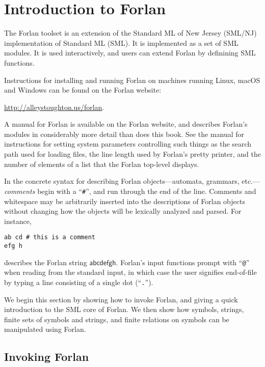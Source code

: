 \section{Introduction to Forlan}
\label{IntroductionToForlan}

The Forlan
%
toolset is an extension of the Standard ML of New Jersey (SML/NJ)
implementation of Standard ML (SML).  It is implemented as a set of
SML modules.  It is used interactively, and users can extend Forlan by
definining SML functions.

Instructions for installing and running Forlan on machines running
%
%
Linux, macOS and Windows can be found on the Forlan website:
\begin{center}
\url{http://alleystoughton.us/forlan}.
\end{center}

A manual for Forlan is available on the Forlan website, and describes
Forlan's modules in considerably more detail than does this book.  See
the manual for instructions for setting system parameters controlling
such things as the search path used for loading files, the line
length used by Forlan's pretty printer, and the number of elements of
a list that the Forlan top-level displays.

In the concrete syntax for describing Forlan objects---automata,
grammars, etc.---\emph{comments} begin with a ``\texttt{\#}'', and run
through the end of the line.  Comments and whitespace may be
arbitrarily inserted into the descriptions of Forlan objects without
changing how the objects will be lexically analyzed and parsed.
For instance,
\begin{verbatim}
ab cd # this is a comment
efg h
\end{verbatim}
describes the Forlan string $\mathsf{abcdefgh}$.
Forlan's input functions prompt with ``\texttt{@}'' when reading from
the standard input, in which case the user signifies end-of-file
by typing a line consisting of a single dot (``\texttt{.}'').

We begin this section by showing how to invoke Forlan, and giving a
quick introduction to the SML core of Forlan.  We then show how
symbols, strings, finite sets of symbols and strings, and finite
relations on symbols can be manipulated using Forlan.

\subsection{Invoking Forlan}

